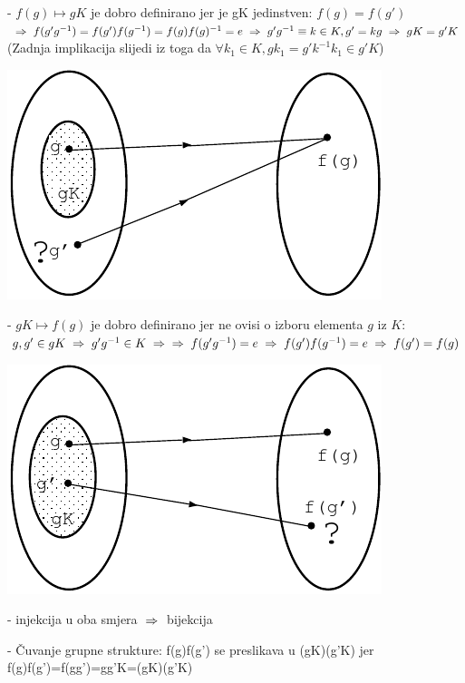 - $f(g)\mapsto gK$ je dobro definirano jer je gK jedinstven: $f(g)=f(g')$
  $\;\Rightarrow\; f(g'g^{-1})=f(g')f(g^{-1})=f(g)f(g)^{-1}=e
   \;\Rightarrow\; g'g^{-1}\equiv k\in K, g'=kg \;\Rightarrow\; gK=g'K$
(Zadnja implikacija slijedi iz toga da $\forall k_1 \in K, gk_1 = 
g' k^{-1}k_1 \in g' K$)

\vspace*{1ex}

\centerline{\includegraphics[scale=0.8]{pics/homo1}}

- $gK\mapsto f(g)$ je dobro definirano jer ne ovisi o izboru
  elementa $g$ iz $K$: $g,g'\in gK \;\Rightarrow\; g'g^{-1}\in K \;\Rightarrow\;
   \;\Rightarrow\; f(g'g^{-1})=e \;\Rightarrow\; f(g')f(g^{-1})=e \;\Rightarrow\; f(g')=f(g)$

\vspace*{1ex}

\centerline{\includegraphics[scale=0.8]{pics/homo2}}

- injekcija u oba smjera $\;\Rightarrow\;$ bijekcija

- Čuvanje grupne strukture: f(g)f(g') se preslikava u (gK)(g'K) jer \\
  f(g)f(g')=f(gg')=gg'K=(gK)(g'K)
  
\vspace*{1ex}


